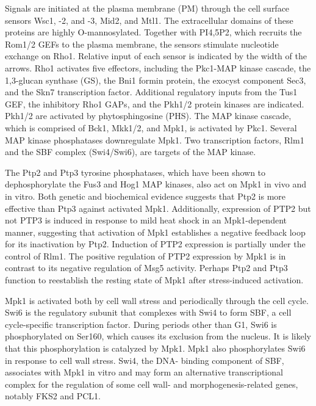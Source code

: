 \documentclass{pracamgr}
\begin{document}
Signals are initiated at the plasma
membrane (PM) through the cell surface sensors Wsc1, -2, and -3,
Mid2, and Mtl1. The extracellular domains of these proteins are highly
O-mannosylated. Together with PI4,5P2, which recruits the Rom1/2
GEFs to the plasma membrane, the sensors stimulate nucleotide
exchange on Rho1. Relative input of each sensor is indicated by the
width of the arrows. Rho1 activates five effectors, including the 
Pkc1-MAP kinase cascade, the 1,3-glucan synthase (GS), the Bni1 formin
protein, the exocyst component Sec3, and the Skn7 transcription 
factor. Additional regulatory inputs from the Tus1 GEF, the inhibitory
Rho1 GAPs, and the Pkh1/2 protein kinases are indicated. Pkh1/2 are
activated by phytosphingosine (PHS). The MAP kinase cascade, which
is comprised of Bck1, Mkk1/2, and Mpk1, is activated by Pkc1. Several
MAP kinase phosphatases downregulate Mpk1. Two transcription 
factors, Rlm1 and the SBF complex (Swi4/Swi6), are targets of the MAP
kinase.\cite{CWI}

The Ptp2 and Ptp3 tyrosine phosphatases, which have been
shown to dephosphorylate the Fus3 and Hog1 MAP kinases,
also act on Mpk1 in vivo and in vitro. Both genetic and
biochemical evidence suggests that Ptp2 is more effective than
Ptp3 against activated Mpk1. Additionally, expression of PTP2
but not PTP3 is induced in response to mild heat shock in an
Mpk1-dependent manner, suggesting that activation of Mpk1
establishes a negative feedback loop for its inactivation by
Ptp2. Induction of PTP2 expression is partially under 
the control of Rlm1. The positive regulation of PTP2 expression
by Mpk1 is in contrast to its negative regulation of Msg5
activity. Perhaps Ptp2 and Ptp3 function to reestablish the
resting state of Mpk1 after stress-induced activation.\cite{CWI}

Mpk1 is activated both by cell wall stress and periodically through the cell cycle.
Swi6 is the regulatory subunit that complexes with Swi4 to form SBF,
a cell cycle-specific transcription factor. During periods other than G1,
Swi6 is phosphorylated on Ser160, which causes its exclusion from the
nucleus. It is likely that this phosphorylation is catalyzed by Mpk1. Mpk1
also phosphorylates Swi6 in response to cell wall stress. Swi4, the DNA-
binding component of SBF, associates with Mpk1 in vitro and may
form an alternative transcriptional complex for the regulation of some
cell wall- and morphogenesis-related genes, notably FKS2 and PCL1.\cite{CWI}
\end{document}
